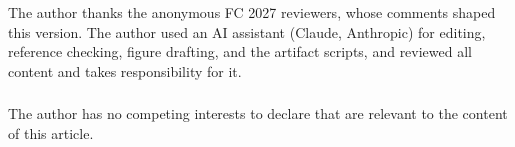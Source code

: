 \documentclass[runningheads]{llncs}
\begin{document}










\begin{credits}
\subsubsection{\ackname} The author thanks the anonymous FC 2027 reviewers, whose comments
shaped this version. The author used an AI assistant (Claude, Anthropic) for editing, reference
checking, figure drafting, and the artifact scripts, and reviewed all content and takes
responsibility for it.

\subsubsection{\discintname} The author has no competing interests to declare that are relevant
to the content of this article.
\end{credits}




\appendix

\end{document}
